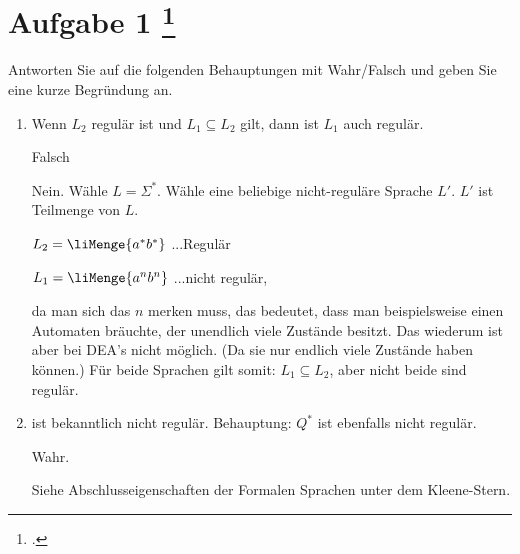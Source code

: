 \documentclass{lehramt-informatik-aufgabe}
\begin{document}

\let\m=\liMenge
\liAufgabenTitel{}
\section{Aufgabe 1
\footcite{examen:66115:2019:03}}

Antworten Sie auf die folgenden Behauptungen mit Wahr/Falsch und geben Sie eine kurze Begründung an.
\begin{enumerate}


\item Wenn $L_2$ regulär ist und $L_1 \subseteq L_2$ gilt, dann ist
$L_1$ auch regulär.

\begin{liAntwort}
Falsch

Nein. Wähle $L = \Sigma^*$. Wähle eine beliebige nicht-reguläre Sprache
$L'$. $L'$ ist Teilmenge von $L$.

%

$L_2 = \m{a^* b^*}$ ...Regulär

$L_1 = \m{a^n
b^n}$ ...nicht regulär,

da man sich das $n$ merken muss, das bedeutet,
dass man beispielsweise einen Automaten bräuchte, der unendlich viele
Zustände besitzt. Das wiederum ist aber bei DEA’s nicht möglich. (Da sie
nur endlich viele Zustände haben können.) Für beide Sprachen gilt somit:
$L_1 \subseteq L_2$, aber nicht beide sind regulär.
\end{liAntwort}


\item {} ist
bekanntlich nicht regulär. Behauptung: $Q^*$ ist ebenfalls nicht
regulär.

\begin{liAntwort}
Wahr.

Siehe Abschlusseigenschaften der Formalen Sprachen unter dem Kleene-Stern.
\end{liAntwort}


\end{enumerate}
\end{document}
